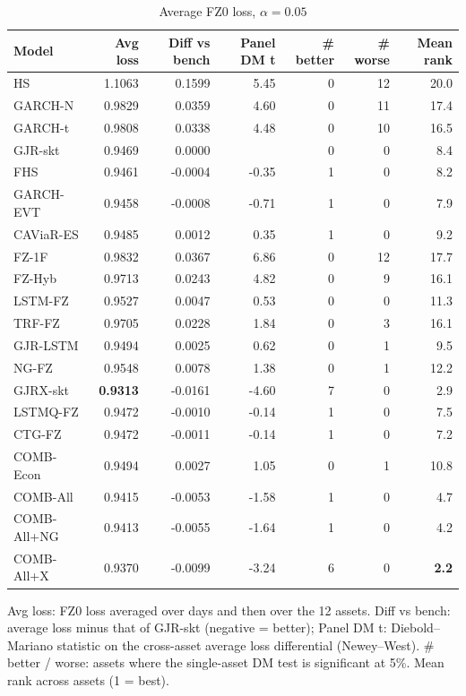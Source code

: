 \begin{table}[htbp]
\centering
\footnotesize
\caption{Average FZ0 loss, $\alpha=0.05$}
\label{tab:loss_a050}
\begin{tabular}{lrrrrrr}
\toprule
Model & Avg loss & Diff vs bench & Panel DM t & \# better & \# worse & Mean rank \\
\midrule
HS & 1.1063 & 0.1599 & 5.45 & 0 & 12 & 20.0 \\
GARCH-N & 0.9829 & 0.0359 & 4.60 & 0 & 11 & 17.4 \\
GARCH-t & 0.9808 & 0.0338 & 4.48 & 0 & 10 & 16.5 \\
GJR-skt & 0.9469 & 0.0000 &  & 0 & 0 & 8.4 \\
FHS & 0.9461 & -0.0004 & -0.35 & 1 & 0 & 8.2 \\
GARCH-EVT & 0.9458 & -0.0008 & -0.71 & 1 & 0 & 7.9 \\
CAViaR-ES & 0.9485 & 0.0012 & 0.35 & 1 & 0 & 9.2 \\
FZ-1F & 0.9832 & 0.0367 & 6.86 & 0 & 12 & 17.7 \\
FZ-Hyb & 0.9713 & 0.0243 & 4.82 & 0 & 9 & 16.1 \\
LSTM-FZ & 0.9527 & 0.0047 & 0.53 & 0 & 0 & 11.3 \\
TRF-FZ & 0.9705 & 0.0228 & 1.84 & 0 & 3 & 16.1 \\
GJR-LSTM & 0.9494 & 0.0025 & 0.62 & 0 & 1 & 9.5 \\
NG-FZ & 0.9548 & 0.0078 & 1.38 & 0 & 1 & 12.2 \\
GJRX-skt & \textbf{0.9313} & -0.0161 & -4.60 & 7 & 0 & 2.9 \\
LSTMQ-FZ & 0.9472 & -0.0010 & -0.14 & 1 & 0 & 7.5 \\
CTG-FZ & 0.9472 & -0.0011 & -0.14 & 1 & 0 & 7.2 \\
COMB-Econ & 0.9494 & 0.0027 & 1.05 & 0 & 1 & 10.8 \\
COMB-All & 0.9415 & -0.0053 & -1.58 & 1 & 0 & 4.7 \\
COMB-All+NG & 0.9413 & -0.0055 & -1.64 & 1 & 0 & 4.2 \\
COMB-All+X & 0.9370 & -0.0099 & -3.24 & 6 & 0 & \textbf{2.2} \\
\bottomrule
\end{tabular}
\par\smallskip\parbox{\linewidth}{\scriptsize Avg loss: FZ0 loss averaged over days and then over the 12 assets. Diff vs bench: average loss minus that of GJR-skt (negative = better); Panel DM t: Diebold--Mariano statistic on the cross-asset average loss differential (Newey--West). \# better / worse: assets where the single-asset DM test is significant at 5\%. Mean rank across assets (1 = best).}
\end{table}